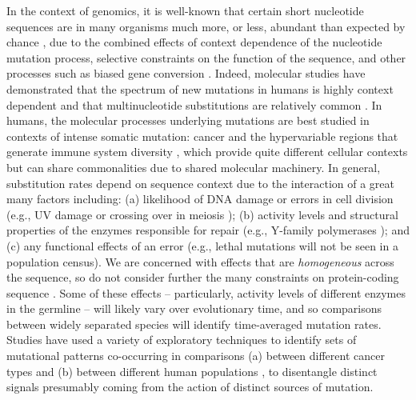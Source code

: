 \documentclass{article}
\theoremstyle{plain}
\theoremstyle{definition}
\begin{document}
In the context of genomics,
it is well-known that certain short nucleotide sequences
are in many organisms much more, or less, abundant than expected by chance \citep{burge1992underrepresentation},
due to the combined effects of context dependence of the nucleotide mutation process,
selective constraints on the function of the sequence,
and other processes such as biased gene conversion \citep{duret2009biased,arbeithuber2015crossovers}.
Indeed, molecular studies have demonstrated that the spectrum of new mutations in humans
is highly context dependent \citep{schaibley2013influence,gao2019overlooked,rodriguezgalindo2020germline}
and that multinucleotide substitutions are relatively common \citep{schrider2011pervasive,terekhanova2013prevalence,harris2013errorprone}.
In humans, the molecular processes underlying mutations are best studied in contexts of intense somatic mutation:
cancer and the hypervariable regions that generate immune system diversity \citep{cobey2015evolution,herediagenestar2020extreme},
which provide quite different cellular contexts but can share commonalities due to shared molecular machinery.
In general, substitution rates depend on sequence context due to the interaction of a great many factors including:
(a) likelihood of DNA damage or errors in cell division (e.g., UV damage \citep{goodman2002errorprone} or crossing over in meiosis \citep{arbeithuber2015crossovers});
(b) activity levels and structural properties of the enzymes responsible for repair
(e.g., Y-family polymerases \citep{goodman2013translesion,sale2012yfamily});
and (c) any functional effects of an error (e.g., lethal mutations will not be seen in a population census).
We are concerned with effects that are \emph{homogeneous} across the sequence,
so do not consider further the many constraints on protein-coding sequence \citep[reviewed in][]{thorne2007protein}.
Some of these effects -- particularly, activity levels of different enzymes in the germline --
will likely vary over evolutionary time,
and so comparisons between widely separated species will identify time-averaged mutation rates.
Studies have used a variety of exploratory techniques to identify sets of mutational patterns
co-occurring in comparisons (a) between different cancer types \citep{alexandrov2013signatures,shiraishi2015simple} and
(b) between different human populations \citep{harris2015evidence,harris2016rapid,mathieson2017differences},
to disentangle distinct signals presumably coming from the action of distinct sources of mutation.
\end{document}
